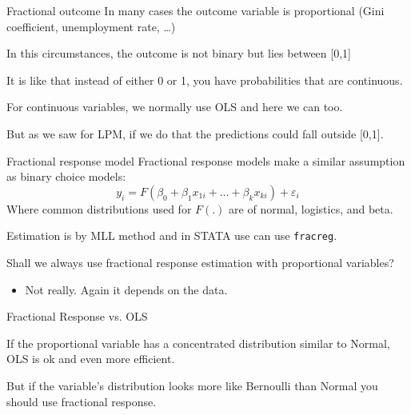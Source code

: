 \documentclass{beamer}
\begin{document}
%
\begin{frame}{Fractional outcome}
In many cases the outcome variable is proportional (Gini coefficient, unemployment rate, \dots)\bigskip

In this circumstances, the outcome is not binary but lies between [0,1]\bigskip

It is like that instead of either 0 or 1, you have probabilities that are continuous.\bigskip

For continuous variables, we normally use OLS and here we can too.\bigskip

But as we saw for LPM, if we do that the predictions could fall outside [0,1].
\end{frame}

\begin{frame}{Fractional response model}
Fractional response models make a similar assumption as binary choice models:
\[y_i=F(\beta_0+\beta_1x_{1i}+\dots+\beta_kx_{ki})+\varepsilon_i \]
Where common distributions used for $F(.)$ are of normal, logistics, and beta.\bigskip

Estimation is by MLL method and in STATA use can use \texttt{fracreg}. \bigskip

Shall we always use fractional response estimation with proportional variables?
\begin{itemize}
\item Not really. Again it depends on the data.
\end{itemize}

\end{frame}

\begin{frame}{Fractional Response vs. OLS}

If the proportional variable has a concentrated distribution similar to Normal, OLS is ok and even more efficient.\medskip

But if the variable's distribution looks more like Bernoulli than Normal you should use fractional response.

\begin{center}
\end{center}

\end{frame}


%
%
\end{document}
